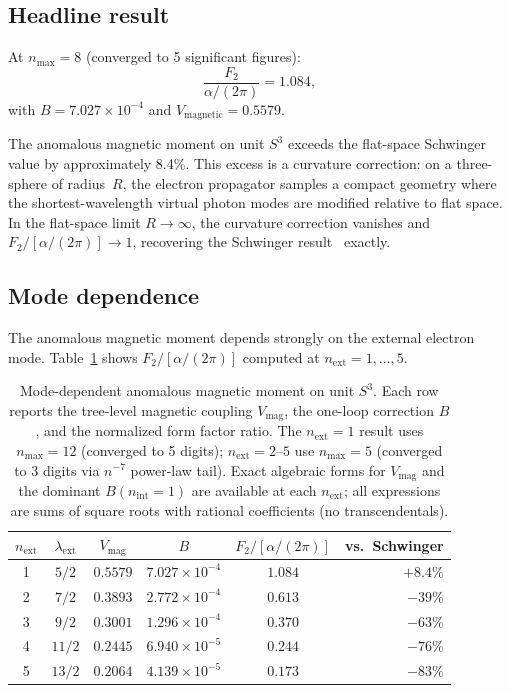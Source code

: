 \documentclass[11pt]{article}
\begin{document}
\subsection{Headline result}

At $n_{\max} = 8$ (converged to 5 significant figures):
\begin{equation}
  \frac{F_2}{\alpha/(2\pi)} = 1.084,
  \label{eq:F2_ratio}
\end{equation}
with $B = 7.027 \times 10^{-4}$ and
$V_{\mathrm{magnetic}} = 0.5579$.

The anomalous magnetic moment on unit $S^3$ exceeds the flat-space
Schwinger value by approximately 8.4\%.  This excess is a
curvature correction: on a three-sphere of radius~$R$, the electron
propagator samples a compact geometry where the shortest-wavelength
virtual photon modes are modified relative to flat space.  In the
flat-space limit $R \to \infty$, the curvature correction vanishes
and $F_2 / [\alpha/(2\pi)] \to 1$, recovering the Schwinger
result~\cite{schwinger1948} exactly.

\subsection{Mode dependence}
\label{sec:mode_dependence}

The anomalous magnetic moment depends strongly on the external electron
mode.  Table~\ref{tab:mode_dependence} shows $F_2/[\alpha/(2\pi)]$
computed at $n_{\mathrm{ext}} = 1, \ldots, 5$.

\begin{table}[h]
\centering
\caption{Mode-dependent anomalous magnetic moment on unit $S^3$.
Each row reports the tree-level magnetic coupling $V_{\mathrm{mag}}$,
the one-loop correction $B$, and the normalized form factor ratio.
The $n_{\mathrm{ext}} = 1$ result uses $n_{\max} = 12$ (converged
to 5 digits); $n_{\mathrm{ext}} = 2$--$5$ use $n_{\max} = 5$
(converged to 3 digits via $n^{-7}$ power-law tail).
Exact algebraic forms for $V_{\mathrm{mag}}$ and the dominant
$B(n_{\mathrm{int}}=1)$ are available at each $n_{\mathrm{ext}}$;
all expressions are sums of square roots with rational coefficients
(no transcendentals).}
\label{tab:mode_dependence}
\begin{tabular}{@{}cccccr@{}}
\toprule
$n_{\mathrm{ext}}$ & $\lambda_{\mathrm{ext}}$
  & $V_{\mathrm{mag}}$ & $B$
  & $F_2 / [\alpha/(2\pi)]$ & vs.\ Schwinger \\
\midrule
1 & $5/2$   & $0.5579$ & $7.027 \times 10^{-4}$ & $1.084$ & $+8.4\%$ \\
2 & $7/2$   & $0.3893$ & $2.772 \times 10^{-4}$ & $0.613$ & $-39\%$ \\
3 & $9/2$   & $0.3001$ & $1.296 \times 10^{-4}$ & $0.370$ & $-63\%$ \\
4 & $11/2$  & $0.2445$ & $6.940 \times 10^{-5}$ & $0.244$ & $-76\%$ \\
5 & $13/2$  & $0.2064$ & $4.139 \times 10^{-5}$ & $0.173$ & $-83\%$ \\
\bottomrule
\end{tabular}
\end{table}
\end{document}
